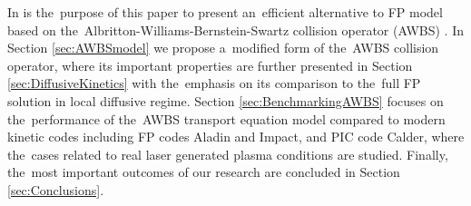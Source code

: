 In is the~purpose of this paper to present an~efficient alternative 
to FP model based on the~Albritton-Williams-Bernstein-Swartz 
collision operator (AWBS) \cite{AWBS_PRL1986}.
In Section \ref{sec:AWBSmodel} we propose a~modified form of 
the~AWBS collision operator, where its important properties are further
presented in Section \ref{sec:DiffusiveKinetics} with the~emphasis on its
comparison to the~full FP solution in local diffusive regime. 
Section \ref{sec:BenchmarkingAWBS} focuses on the~performance of the~AWBS 
transport equation model compared to modern kinetic codes including FP codes
Aladin and Impact, and PIC code Calder, where the~cases related to real
laser generated plasma conditions are studied. Finally, the~most important
outcomes of our research are concluded in Section \ref{sec:Conclusions}. 
